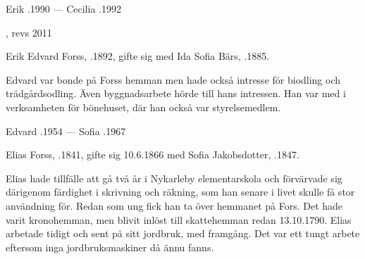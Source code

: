 Erik .1990  ---  Cecilia .1992


, revs 2011



Erik Edvard Forss, .1892, gifte sig med Ida Sofia Bärs, .1885.
\begin{jhchildren}
  \item {}
  \item {}
  \item {}
\end{jhchildren}
Edvard var bonde på Forss hemman men hade också intresse för biodling och trädgårdsodling. Även byggnadsarbete hörde till hans intressen. Han var med i verksamheten för bönehuset, där han också var styrelsemedlem.

Edvard .1954  ---  Sofia .1967


Elias Forss, .1841, gifte sig 10.6.1866 med Sofia Jakobsdotter, .1847.
\begin{jhchildren}
  \item {}
  \item {}
  \item {}
  \item {}
  \item {}
  \item {}
  \item {}
  \item {}
  \item {}
  \item {}
\end{jhchildren}

Elias hade tillfälle att gå två år i Nykarleby elementarskola och förvärvade sig därigenom färdighet i skrivning och räkning, som han senare i livet skulle få stor användning för. Redan som ung fick han ta över hemmanet på Fors. Det hade varit kronohemman, men blivit inlöst till skattehemman redan 13.10.1790. Elias arbetade tidigt och sent på sitt jordbruk, med framgång. Det var ett tungt arbete eftersom inga jordbruksmaskiner då ännu fanns.

